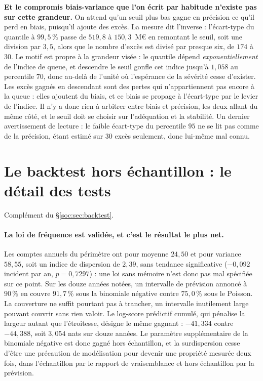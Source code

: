 \begin{attention}
\textbf{Et le compromis biais-variance que l'on écrit par habitude n'existe pas sur cette
grandeur.} On attend qu'un seuil plus bas gagne en précision ce qu'il perd en biais, puisqu'il
ajoute des excès. La mesure dit l'inverse : l'écart-type du quantile à $99{,}5\,\%$ passe de
$519{,}8$ à $150{,}3$~M\euro{} en remontant le seuil, soit une division par $3{,}5$, alors que le
nombre d'excès est divisé par presque six, de $174$ à $30$. Le motif est propre à la grandeur
visée : le quantile dépend \emph{exponentiellement} de l'indice de queue, et descendre le seuil
gonfle cet indice jusqu'à $1{,}058$ au percentile $70$, donc au-delà de l'unité où l'espérance de
la sévérité cesse d'exister. Les excès gagnés en descendant sont des pertes qui n'appartiennent
pas encore à la queue : elles ajoutent du biais, et ce biais se propage à l'écart-type par le
levier de l'indice. Il n'y a donc rien à arbitrer entre biais et précision, les deux allant du
même côté, et le seuil doit se choisir sur l'adéquation et la stabilité. Un dernier avertissement
de lecture : le faible écart-type du percentile $95$ ne se lit pas comme de la précision, étant
estimé sur $30$ excès seulement, donc lui-même mal connu.
\end{attention}

\section{Le backtest hors échantillon : le détail des tests}
\label{sec:ann-backtest}


Complément du \S\ref{soc:sec:backtest}.

\paragraph{La loi de fréquence est validée, et c'est le résultat le plus net.} Les comptes
annuels du périmètre ont pour moyenne $24{,}50$ et pour variance $58{,}55$, soit un indice de
dispersion de $2{,}39$, sans tendance significative ($-0{,}092$ incident par an, $p=0{,}7297$) :
une loi sans mémoire n'est donc pas mal spécifiée sur ce point. Sur les douze années notées, un
intervalle de prévision annoncé à $90\,\%$ en couvre $91{,}7\,\%$ sous la binomiale négative
contre $75{,}0\,\%$ sous le Poisson. La couverture ne suffit pourtant pas à trancher, un
intervalle inutilement large pouvant couvrir sans rien valoir. Le log-score prédictif
cumulé, qui pénalise la largeur autant que l'étroitesse, désigne le même gagnant :
$-41{,}334$ contre $-44{,}388$, soit $3{,}054$ nats sur douze années. Le paramètre
supplémentaire de la binomiale négative est donc gagné hors échantillon, et la surdispersion
cesse d'être une précaution de modélisation pour devenir une propriété mesurée deux fois, dans
l'échantillon par le rapport de vraisemblance et hors échantillon par la prévision.

